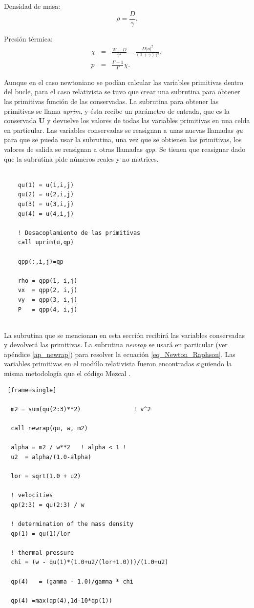 \documentclass[12pt,a4paper]{book}
\providecommand{\abs}[1]{\lvert#1\rvert} %
\begin{document}
\noindent Densidad de masa: 
\begin{equation}
\rho=\frac{D}{\gamma}.
\end{equation}

\noindent Presión térmica:
\begin{eqnarray}
\chi&=&\frac{W-D}{\gamma^{2}}-\frac{D \abs{u}^{2}}{(1+\gamma)\gamma^{2}},\\
p&=&\frac{\Gamma-1}{\Gamma} \chi.
\end{eqnarray}

Aunque en el caso newtoniano se podían calcular las variables primitivas dentro del bucle, 
para el caso relativista se tuvo que crear una subrutina para obtener las primitivas función de las conservadas. 
La subrutina para obtener las primitivas se llama \emph{uprim}, 
y ésta recibe un parámetro de entrada, que es la conservada $\mathbf{U}$ y devuelve los valores de todas las variables primitivas en una celda en particular. 
Las variables conservadas se reasignan a unas nuevas llamadas \emph{qu} para que se pueda usar la subrutina, una vez que se obtienen las primitivas, 
los valores de salida se reasignan a otras llamadas \emph{qpp}. Se tienen que reasignar dado que la subrutina pide números reales y no matrices.

\begin{lstlisting}[frame=single] 
        
    qu(1) = u(1,i,j)
    qu(2) = u(2,i,j)
    qu(3) = u(3,i,j)
    qu(4) = u(4,i,j)

    ! Desacoplamiento de las primitivas
    call uprim(u,qp)

    qpp(:,i,j)=qp

    rho = qpp(1, i,j)
    vx  = qpp(2, i,j)
    vy  = qpp(3, i,j)
    P   = qpp(4, i,j)


\end{lstlisting}

\noindent La subrutina que se mencionan en esta sección recibirá las variables conservadas
y devolverá las primitivas. La subrutina \emph{newrap}  
se usará en particular 
(ver apéndice \ref{ap_newrap}) para resolver la ecuación \ref{eq_Newton_Raphson}.  Las variables primitivas en el modúlo relativista fueron encontradas siguiendo la misma metodología que el código Mezcal \citep{Colle2012}.

\begin{lstlisting} [frame=single]
  
  m2 = sum(qu(2:3)**2)               ! v^2

  call newrap(qu, w, m2)

  alpha = m2 / w**2   ! alpha < 1 !
  u2  = alpha/(1.0-alpha)

  lor = sqrt(1.0 + u2)

  ! velocities
  qp(2:3) = qu(2:3) / w

  ! determination of the mass density
  qp(1) = qu(1)/lor

  ! thermal pressure
  chi = (w - qu(1)*(1.0+u2/(lor+1.0)))/(1.0+u2)

  qp(4)   = (gamma - 1.0)/gamma * chi

  qp(4) =max(qp(4),1d-10*qp(1))
\end{lstlisting}
\end{document}
